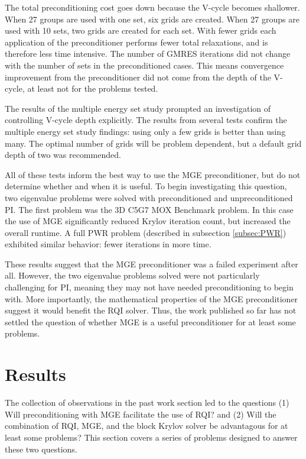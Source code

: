\documentclass[preprint,12pt]{elsarticle}
\begin{document}
The total preconditioning cost goes down because the V-cycle becomes shallower. When 27 groups are used with one set, six grids are created. When 27 groups are used with 10 sets, two grids are created for each set. With fewer grids each application of the preconditioner performs fewer total relaxations, and is therefore less time intensive. The number of GMRES iterations did not change with the number of sets in the preconditioned cases. This means convergence improvement from the preconditioner did not come from the depth of the V-cycle, at least not for the problems tested.

The results of the multiple energy set study prompted an investigation of controlling V-cycle depth explicitly. The results from several tests confirm the multiple energy set study findings: using only a few grids is better than using many. The optimal number of grids will be problem dependent, but a default grid depth of two was recommended.

All of these tests inform the best way to use the MGE preconditioner, but do not determine whether and when it is useful. To begin investigating this question, two eigenvalue problems were solved with preconditioned and unpreconditioned PI. The first problem was the 3D C5G7 MOX Benchmark problem. In this case the use of MGE significantly reduced Krylov iteration count, but increased the overall runtime. A full PWR problem (described in subsection \ref{subsec:PWR}) exhibited similar behavior: fewer iterations in more time. 

These results suggest that the MGE preconditioner was a failed experiment after all. However, the two eigenvalue problems solved were not particularly challenging for PI, meaning they may not have needed preconditioning to begin with. More importantly, the mathematical properties of the MGE preconditioner suggest it would benefit the RQI solver. Thus, the work published so far has not settled the question of whether MGE is a useful preconditioner for at least some problems. 

\section{Results}
\label{sec:results}
The collection of observations in the past work section led to the questions (1) Will preconditioning with MGE facilitate the use of RQI? and (2) Will the combination of RQI, MGE, and the block Krylov solver be advantagous for at least some problems? This section covers a series of problems designed to answer these two questions. 
\end{document}
